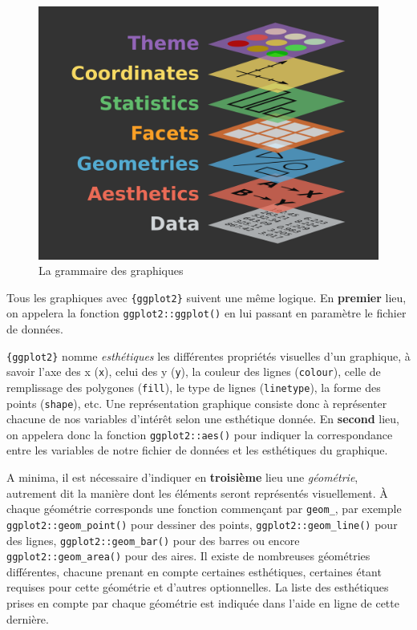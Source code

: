 \documentclass[
  letterpaper,
  DIV=11,
  numbers=noendperiod,
  oneside]{scrreprt}
\begin{document}
\begin{figure}

{\centering \includegraphics{analyses/ressources/ggplot-grammar-of-graphics.png}

}

\caption{\label{fig-grammaire-graphiques}La grammaire des graphiques}

\end{figure}

Tous les graphiques avec \texttt{\{ggplot2\}} suivent une même logique.
En \textbf{premier} lieu, on appelera la fonction
\texttt{ggplot2::ggplot()} en lui passant en paramètre le fichier de
données.

\texttt{\{ggplot2\}} nomme \emph{esthétiques} les différentes propriétés
visuelles d'un graphique, à savoir l'axe des x (\texttt{x}), celui des y
(\texttt{y}), la couleur des lignes (\texttt{colour}), celle de
remplissage des polygones (\texttt{fill}), le type de lignes
(\texttt{linetype}), la forme des points (\texttt{shape}), etc. Une
représentation graphique consiste donc à représenter chacune de nos
variables d'intérêt selon une esthétique donnée. En \textbf{second}
lieu, on appelera donc la fonction \texttt{ggplot2::aes()} pour indiquer
la correspondance entre les variables de notre fichier de données et les
esthétiques du graphique.

A minima, il est nécessaire d'indiquer en \textbf{troisième} lieu une
\emph{géométrie}, autrement dit la manière dont les éléments seront
représentés visuellement. À chaque géométrie corresponds une fonction
commençant par \texttt{geom\_}, par exemple
\texttt{ggplot2::geom\_point()} pour dessiner des points,
\texttt{ggplot2::geom\_line()} pour des lignes,
\texttt{ggplot2::geom\_bar()} pour des barres ou encore
\texttt{ggplot2::geom\_area()} pour des aires. Il existe de nombreuses
géométries différentes, chacune prenant en compte
certaines esthétiques, certaines étant requises pour cette géométrie et
d'autres optionnelles. La liste des esthétiques prises en compte par
chaque géométrie est indiquée dans l'aide en ligne de cette dernière.
\end{document}
